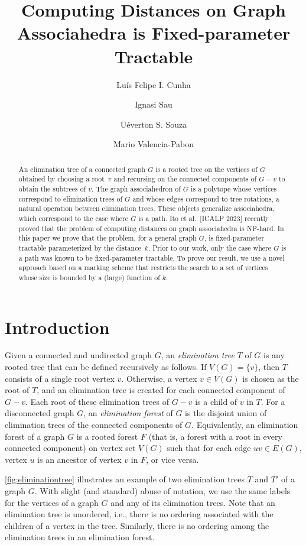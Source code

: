 \documentclass[a4paper,UKenglish,cleveref, autoref, thm-restate]{lipics-v2021}
\title{Computing Distances on Graph Associahedra is Fixed-parameter Tractable}
\author{Lu\'is Felipe I. Cunha}{Instituto de Computação, Universidade Federal Fluminense, Brasil \and \url{http://www.ic.uff.br/~lfignacio} }{lfignacio@ic.uff.br}{https://orcid.org/0000-0002-3797-6053}{FAPERJ-JCNE (E-26/201.372/2022) and~CNPq-Universal~(406173/2021-4).}
\author{Ignasi Sau}{LIRMM, Université de Montpellier, CNRS, France \and \url{https://www.lirmm.fr/~sau/} }{ignasi.sau@lirmm.fr}{https://orcid.org/0000-0002-8981-9287}{French project \textsc{ELiT} (ANR-20-CE48-0008-01).}
\author{U\'everton S. Souza}{Instituto de Computação, Universidade Federal Fluminense, Brasil \and IMPA - Instituto de Matem\'atica Pura e Aplicada, Brasil \and \url{http://www.ic.uff.br/~ueverton} }{ueverton@ic.uff.br}{https://orcid.org/0000-0002-5320-9209}{CNPq (312344/2023-6), and FAPERJ (E-26/201.344/2021).}
\author{Mario Valencia-Pabon}{Université de Lorraine, CNRS, Inria, LORIA, F-54000 Nancy, France \and \url{https://lipn.univ-paris13.fr/~valenciapabon/}}
{mario.valencia@loria.fr}{https://orcid.org/0009-0006-0564-4341}{French project \textsc{Abysm} (ANR-23-CE48-0017).}
\newcommand{\NP}{\mathcal{NP}}
\renewcommand{\NP}{{\sf NP}\xspace}
\begin{document}
\maketitle

\begin{abstract}
An elimination tree of a connected graph $G$ is a rooted tree on the vertices of $G$ obtained by choosing a root~$v$ and recursing on the connected components of $G-v$ to obtain the subtrees of $v$. The graph associahedron of $G$ is a polytope whose vertices correspond to elimination trees of $G$ and whose edges correspond to tree rotations, a natural operation between elimination trees. These objects generalize associahedra, which correspond to the case where $G$ is a path. Ito et al.~[ICALP 2023] recently proved that the problem of computing distances on graph associahedra is \NP-hard. In this paper we prove that the problem, for a general graph $G$,  is fixed-parameter tractable parameterized by the distance~$k$. Prior to our work, only the case where $G$ is a path was known to be fixed-parameter tractable. To prove our result, we use a novel approach based on a marking scheme that restricts the search to a set of vertices whose size is bounded by a (large) function of $k$.
\end{abstract}


\section{Introduction}
\label{sec:intro}



Given a connected and undirected graph $G$, an \emph{elimination tree} $T$ of $G$ is any rooted tree that can be defined recursively as follows. If $V(G)=\{v\}$, then $T$ consists of a single root vertex $v$. Otherwise, a vertex $v \in V(G)$ is chosen as the root of $T$, and an elimination tree is created for each connected component of $G - v$. Each root of these elimination trees of $G - v$ is a child of $v$ in $T$. For a disconnected graph $G$, an \textit{elimination forest} of $G$ is the disjoint union of elimination trees of the connected components of $G$. Equivalently, an elimination forest of a graph $G$ is a rooted
forest $F$ (that is, a forest with a root in every connected component) on vertex set $V(G)$ such that for each edge $u v \in E(G)$, vertex $u$ is an ancestor
of vertex $v$ in $F$, or vice versa.


\autoref{fig:eliminationtree} illustrates an example of two elimination trees $T$ and $T'$ of a graph $G$. With slight (and standard) abuse of notation, we use the same labels for the vertices of a graph $G$ and any of its elimination trees. Note that an elimination tree is unordered, i.e., there is no ordering associated with the children of a vertex in the tree. Similarly, there is no ordering among the elimination trees in an elimination forest.
\end{document}
